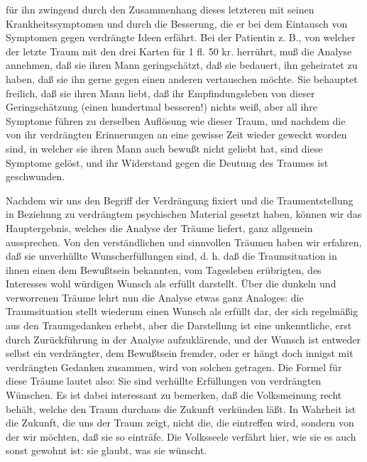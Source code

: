 \documentclass[twoside=true,titlepage=false,open=any, parskip=never, fontsize=10pt, headings=small, chapterprefix=false, appendixprefix=false]{scrbook}
\begin{document}
        \pstart
        für ihn zwingend durch den Zusammenhang dieses letzteren mit seinen
               Krankheitssymptomen und durch die Besserung, die er bei dem Eintausch von
               Symptomen gegen verdrängte Ideen erfährt. Bei der Patientin z. B., von welcher
               der letzte Traum mit den drei Karten für 1 fl. 50 kr. herrührt, muß die
               Analyse annehmen, daß sie ihren Mann geringschätzt, daß sie bedauert, ihn
               geheiratet zu haben, daß sie ihn gerne gegen einen anderen vertauschen möchte.
               Sie behauptet freilich, daß sie ihren Mann liebt, daß ihr Empfindungsleben von
               dieser Geringschätzung (einen hundertmal besseren!) nichts weiß, aber
               all ihre Symptome führen zu derselben Auflösung wie dieser Traum, und nachdem
               die von ihr verdrängten Erinnerungen an eine gewisse Zeit wieder geweckt
               worden sind, in welcher sie ihren Mann auch bewußt nicht geliebt hat, sind diese
               Symptome gelöst, und ihr Widerstand gegen die Deutung des Traumes ist
               geschwunden.
        \pend
    
         
            
            
            \pstart[\section{IX}]\pend
            
        \pstart
        Nachdem wir uns den Begriff der Verdrängung fixiert und die Traumentstellung in
               Beziehung zu verdrängtem psychischen Material gesetzt haben, können wir das
               Hauptergebnis, welches die Analyse der Träume liefert, ganz allgemein
               aussprechen. Von den verständlichen und sinnvollen Träumen haben wir
               erfahren, daß sie unverhüllte Wunscherfüllungen sind, d. h. daß die Traumsituation in ihnen einen dem Bewußtsein bekannten, vom Tagesleben erübrigten, des Interesses wohl würdigen Wunsch als erfüllt
               darstellt. Über die dunkeln und verworrenen Träume lehrt nun die Analyse etwas
               ganz Analoges: die Traumsituation stellt wiederum einen Wunsch als erfüllt dar,
               der sich regelmäßig aus den Traumgedanken erhebt, aber die
               Darstellung ist eine unkenntliche, erst durch Zurückführung in der Analyse
               aufzuklärende, und der Wunsch ist entweder selbst ein verdrängter,
               dem Bewußtsein fremder, oder er hängt doch innigst mit verdrängten Gedanken
               zusammen, wird von solchen getragen. Die Formel für diese Träume lautet also:
                  Sie sind verhüllte Erfüllungen von verdrängten Wünschen. Es
               ist dabei interessant zu bemerken, daß die Volksmeinung recht behält, welche den
               Traum durchaus die Zukunft verkünden läßt. In Wahrheit ist die Zukunft, die uns
               der Traum zeigt, nicht die, die eintreffen wird, sondern von der wir
               möchten, daß sie so einträfe. Die Volksseele verfährt hier, wie sie es auch
               sonst gewohnt ist: sie glaubt, was sie wünscht.
        \pend
    
\end{document}

